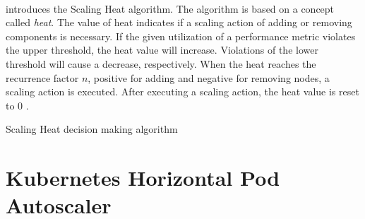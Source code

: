 \paragraph{} introduces the Scaling Heat algorithm.
The algorithm is based on a concept called \textit{heat}. The value of heat indicates if a scaling action of adding or removing components is necessary.
If the given utilization of a performance metric violates the upper threshold, the heat value will increase. Violations of the lower threshold will cause a decrease, respectively.
When the heat reaches the recurrence factor $n$, positive for adding and negative for removing nodes, a scaling action is executed.
After executing a scaling action, the heat value is reset to 0 \cite{Barna2017ElasticContainerApps}.
\begin{algorithm}[H]
\SetAlgoLined
{}
\caption{Scaling Heat decision making algorithm\cite{Barna2017ElasticContainerApps}}
\label{alg:04_scal-heat_concept_algo}
\end{algorithm}


\newpage
\section{Kubernetes Horizontal Pod Autoscaler}
\label{sec:04_background_khpa}
